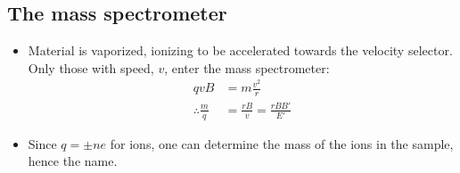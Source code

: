 \documentclass[aspectratio=169,
hyperref={colorlinks,urlcolor=blue}
]{beamer}
\begin{document}
\subsection{The mass spectrometer}
\label{subsec:themassspectrometer}
{%
\begin{itemize}
\item Material is vaporized, ionizing to be accelerated towards the velocity selector. Only those with speed, $v$, enter the mass spectrometer:
\begin{align*}
qvB &= m\frac{v^2}{r}\\
\therefore \frac{m}{q} &= \frac{rB}{v} =\frac{rBB'}{E'}
\end{align*}
\item Since $q=\pm ne$ for ions, one can determine the mass of the ions in the sample, hence the name.
\end{itemize}
}
\end{document}
